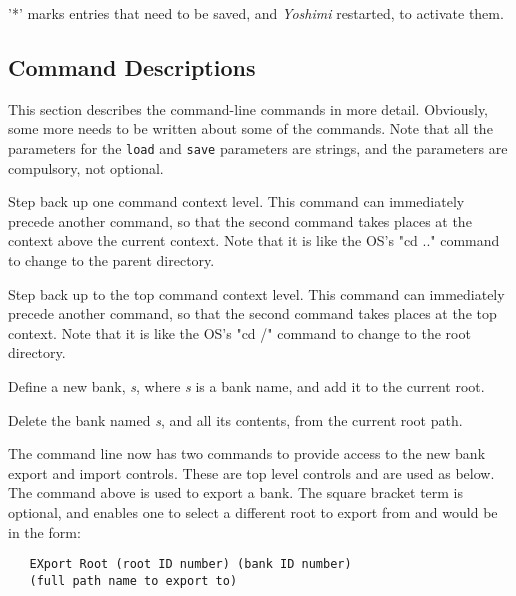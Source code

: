    '*' marks entries that need to be saved, and \textsl{Yoshimi}
   restarted, to activate them.

\subsection{Command Descriptions}
\label{subsec:command_line_command_descriptions}

   This section describes the command-line commands in more detail.
   Obviously, some more needs to be written about some of the commands.
   Note that all the parameters for the \texttt{load} and \texttt{save}
   parameters are strings, and the parameters are compulsory, not optional.

   \setcounter{ItemCounter}{0}      %

      Step back up one command context level.
      This command can immediately precede another command, so that the
      second command takes places at the context above the current context.
      Note that it is like the OS's "cd .." command to change to the parent
      directory.

      Step back up to the top command context level.
      This command can immediately precede another command, so that the
      second command takes places at the top context.
      Note that it is like the OS's "cd /" command to change to the root
      directory.

      Define a new bank, \textsl{s}, where \textsl{s} is a bank name,
      and add it to the current root.

      Delete the bank named \textsl{s}, and all its contents,
      from the current root path.

      The command line now has two commands to provide access to the new bank
      export and import controls. These are top level controls and are used
      as below.  The command above is used to export a bank. The square
      bracket term is optional, and enables one to select a different root to
      export from and would be in the form:

\begin{verbatim}
   EXport Root (root ID number) (bank ID number)
   (full path name to export to)
\end{verbatim}

